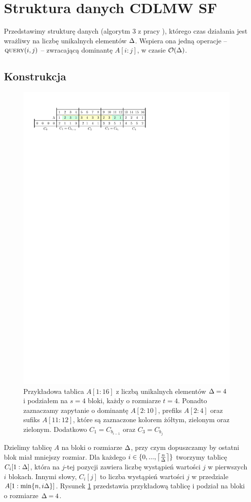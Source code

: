 \section{Struktura danych \textsc{CDLMW SF}}
\label{sec:sf}
Przedstawimy strukturę danych (algorytm 3 z pracy \cite{chan14}), którego czas działania jest wrażliwy na liczbę unikalnych elementów $\Delta$. Wspiera ona jedną operacje -- $\textsc{query}(i,j)$ -- zwracającą dominantę $A[i:j]$, w czasie $\mathcal{O}(\Delta)$.
\subsection{Konstrukcja}
\begin{figure}[H]
    \centering
    \includegraphics[scale=1.1]{images/sf.pdf}
    \caption{
    Przykładowa tablica $A[1:16]$ z liczbą unikalnych elementów $\Delta=4$ i podziałem na $s=4$ bloki, każdy o rozmiarze $t=4$. Ponadto zaznaczamy zapytanie o dominantę $A[2:10]$, prefiks $A[2:4]$ oraz sufiks $A[11:12]$, które są zaznaczone kolorem żółtym, zielonym oraz zielonym. Dodatkowo $C_1=C_{b_{i-1}}$ oraz $C_3 = C_{b_j}$}
    \label{fig:sparse_freq_tbl}
\end{figure}
  Dzielimy tablicę $A$ na bloki o rozmiarze $\Delta$, przy czym dopuszczamy by ostatni blok miał mniejszy rozmiar. Dla każdego $i \in \{0, ..., \left\lceil\frac n {\Delta}\right\rceil\}$ tworzymy tablicę $C_i[1:\Delta]$, która na $j$-tej pozycji zawiera liczbę wystąpień wartości $j$ w pierwszych $i$ blokach. Innymi słowy, $C_i[j]$ to liczba wystąpień wartości $j$ w przedziale $A[1:\min\{n, i\Delta\}]$. Rysunek \ref{fig:sparse_freq_tbl} przedstawia przykładową tablicę i podział na bloki o rozmiarze $\Delta=4$.
